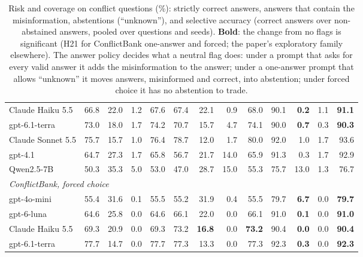 \begin{table}[t]
{\begin{tabular}{lrrrrrrrrrrrr}
Claude Haiku 5.5 & 66.8 & 22.0 & 1.2 & 67.6 & 67.4 & 22.1 & 0.9 & 68.0 & 90.1 & \textbf{0.2} & 1.1 & \textbf{91.1} \\
gpt-6.1-terra & 73.0 & 18.0 & 1.7 & 74.2 & 70.7 & 15.7 & 4.7 & 74.1 & 90.0 & \textbf{0.7} & 0.3 & \textbf{90.3} \\
Claude Sonnet 5.5 & 75.7 & 15.7 & 1.0 & 76.4 & 78.7 & 12.0 & 1.7 & 80.0 & 92.0 & 1.0 & 1.7 & 93.6 \\
gpt-4.1 & 64.7 & 27.3 & 1.7 & 65.8 & 56.7 & 21.7 & 14.0 & 65.9 & 91.3 & 0.3 & 1.7 & 92.9 \\
Qwen2.5-7B & 50.3 & 35.3 & 5.0 & 53.0 & 47.0 & 28.7 & 15.0 & 55.3 & 75.7 & 13.0 & 1.3 & 76.7 \\
\midrule
\multicolumn{13}{l}{\emph{ConflictBank, forced choice}} \\
gpt-4o-mini & 55.4 & 31.6 & 0.1 & 55.5 & 55.2 & 31.9 & 0.4 & 55.5 & 79.7 & \textbf{6.7} & 0.0 & \textbf{79.7} \\
gpt-6-luna & 64.6 & 25.8 & 0.0 & 64.6 & 66.1 & 22.0 & 0.0 & 66.1 & 91.0 & \textbf{0.1} & 0.0 & \textbf{91.0} \\
Claude Haiku 5.5 & 69.3 & 20.9 & 0.0 & 69.3 & 73.2 & \textbf{16.8} & 0.0 & \textbf{73.2} & 90.4 & \textbf{0.0} & 0.0 & \textbf{90.4} \\
gpt-6.1-terra & 77.7 & 14.7 & 0.0 & 77.7 & 77.3 & 13.3 & 0.0 & 77.3 & 92.3 & \textbf{0.3} & 0.0 & \textbf{92.3} \\
\bottomrule
\end{tabular}}
\caption{Risk and coverage on conflict questions (\%): strictly correct answers, answers that contain the
misinformation, abstentions (``unknown''), and selective accuracy (correct answers over non-abstained answers, pooled
over questions and seeds). \textbf{Bold}: the change from no flags is significant (H21 for
ConflictBank one-answer and forced; the paper's exploratory family elsewhere). The answer policy decides what a neutral
flag does: under a prompt that asks for every valid answer it adds the misinformation to the answer; under a one-answer
prompt that allows ``unknown'' it moves answers, misinformed and correct, into abstention; under forced choice it has
no abstention to trade.}
\label{tab:risk}
\end{table}
